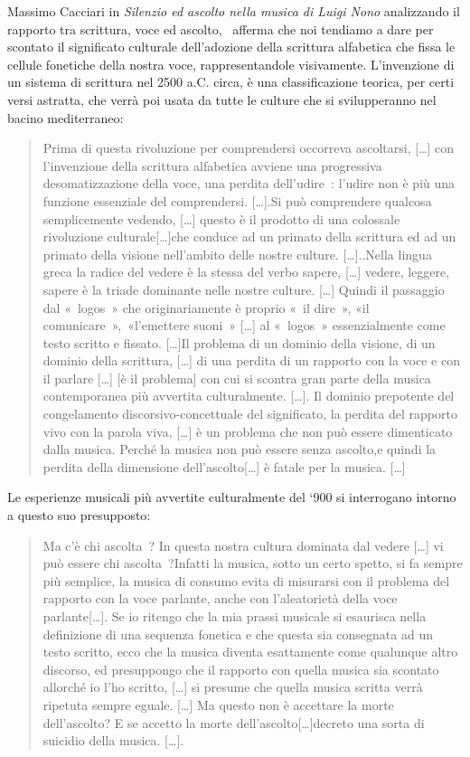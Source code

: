 Massimo Cacciari in \emph{Silenzio ed ascolto nella musica di Luigi Nono}
analizzando  il rapporto tra scrittura, voce ed ascolto,  afferma che noi
tendiamo a dare per scontato il significato culturale dell’adozione della
scrittura alfabetica che fissa  le cellule fonetiche della nostra voce,
rappresentandole visivamente. L’invenzione di un sistema di scrittura  nel
2500 a.C. circa, è una classificazione teorica, per certi versi astratta, che
verrà poi usata da tutte le culture che si svilupperanno nel bacino mediterraneo:

\begin{quote}
Prima di questa rivoluzione per comprendersi occorreva ascoltarsi, [\ldots] con
l’invenzione della scrittura alfabetica avviene una progressiva desomatizzazione
della voce, una perdita dell’udire : l’udire non è più una funzione essenziale
del comprendersi. [\ldots].Si può comprendere qualcosa semplicemente vedendo, [\ldots]
questo è il prodotto di una colossale rivoluzione culturale[\ldots]che conduce ad un
primato della scrittura  ed ad un primato della visione nell’ambito delle nostre
culture. [\ldots]..Nella lingua greca la radice del vedere è la stessa del verbo
sapere, [\ldots] vedere, leggere, sapere è la triade dominante nelle nostre culture.
[\ldots] Quindi il passaggio dal « logos » che originariamente è proprio « il dire »,
«il comunicare », «l’emettere suoni » [\ldots] al « logos » essenzialmente come testo
scritto e fissato. [\ldots]Il problema di un dominio della visione, di un dominio della
scrittura, [\ldots] di una perdita di un rapporto con la voce e con il parlare [\ldots]
[è il problema] con cui si scontra gran parte della musica contemporanea più
avvertita culturalmente. [\ldots]. Il dominio prepotente del congelamento
discorsivo-concettuale del significato, la perdita del rapporto vivo con la
parola viva, [\ldots] è un problema che non può essere dimenticato dalla musica.
Perché la musica non può essere senza ascolto,e quindi la perdita della
dimensione dell’ascolto[\ldots] è fatale per la musica. [\ldots]
\end{quote}

Le esperienze musicali più avvertite culturalmente  del ‘900 si interrogano
intorno a questo suo presupposto:

\begin{quote}
Ma c’è chi ascolta ? In questa nostra
cultura dominata dal vedere [\ldots] vi può essere chi ascolta ?Infatti la
musica, sotto un certo spetto, si fa sempre più semplice, la musica di consumo
evita di misurarsi  con il problema del rapporto con la voce parlante, anche
con l’aleatorietà della voce parlante[\ldots].
Se io ritengo che la mia prassi musicale  si esaurisca nella definizione di una
sequenza fonetica e che questa sia consegnata ad un testo scritto, ecco che la
musica diventa esattamente come qualunque altro discorso, ed presuppongo che il
rapporto con quella musica sia scontato allorché io l’ho scritto, [\ldots] si presume
che quella musica scritta verrà ripetuta sempre eguale. [\ldots] Ma questo non è
accettare la morte dell’ascolto? E se accetto la morte dell’ascolto[\ldots]decreto
una sorta di suicidio della musica. [\ldots].
\end{quote}


